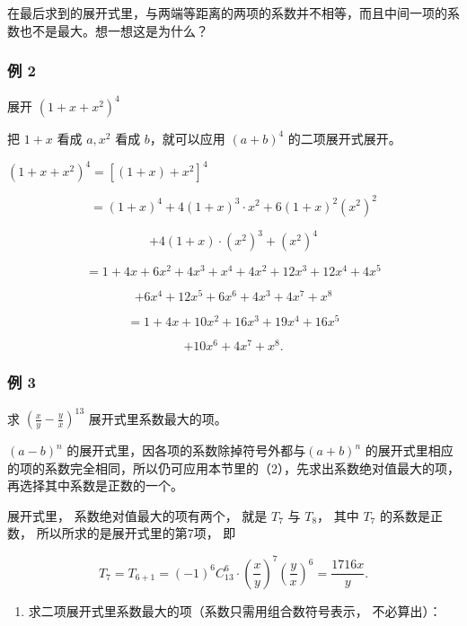 在最后求到的展开式里，与两端等距离的两项的系数并不相等，而且中间一项的系数也不是最大。想一想这是为什么？

\subsubsection{例 2}

展开 \((1 + x + x^2)^4\)

 把 \(1 + x\) 看成 \(a, x^2\) 看成 \(b\)，就可以应用
\((a + b)^4\) 的二项展开式展开。

 \((1 + x + x^2)^4 = [(1 + x) + x^2]^4\)

\[
= (1 + x) ^ {4} + 4 (1 + x) ^ {3} \cdot x ^ {2} + 6 (1 + x) ^ {2} \left(x ^ {2}\right) ^ {2}
\]

\[
+ 4 (1 + x) \cdot \left(x ^ {2}\right) ^ {3} + \left(x ^ {2}\right) ^ {4}
\]

\[
= 1 + 4 x + 6 x ^ {2} + 4 x ^ {3} + x ^ {4} + 4 x ^ {2} + 12 x ^ {3} + 12 x ^ {4} + 4 x ^ {5}
\]

\[
+ 6 x ^ {4} + 12 x ^ {5} + 6 x ^ {6} + 4 x ^ {3} + 4 x ^ {7} + x ^ {8}
\]

\[
= 1 + 4 x + 10 x ^ {2} + 16 x ^ {3} + 19 x ^ {4} + 16 x ^ {5}
\]

\[
+ 10 x ^ {6} + 4 x ^ {7} + x ^ {8}.
\]

\subsubsection{例 3}

求 \(\left(\frac{x}{y} - \frac{y}{x}\right)^{13}\)
展开式里系数最大的项。

 \((a - b)^n\)
的展开式里，因各项的系数除掉符号外都与\((a+b)^{n}\)
的展开式里相应的项的系数完全相同，所以仍可应用本节里的（2），先求出系数绝对值最大的项，再选择其中系数是正数的一个。

 展开式里， 系数绝对值最大的项有两个， 就是 \(T_{7}\) 与
\(T_{8}\)， 其中 \(T_{7}\) 的系数是正数， 所以所求的是展开式里的第7项，
即

\[
T _ {7} = T _ {6 + 1} = (- 1) ^ {6} C _ {13} ^ {6} \cdot \left(\frac {x}{y}\right) ^ {7} \left(\frac {y}{x}\right) ^ {6} = \frac {1716 x}{y}.
\]

\begin{enumerate}
\item
  求二项展开式里系数最大的项（系数只需用组合数符号表示， 不必算出）：
\end{enumerate}


